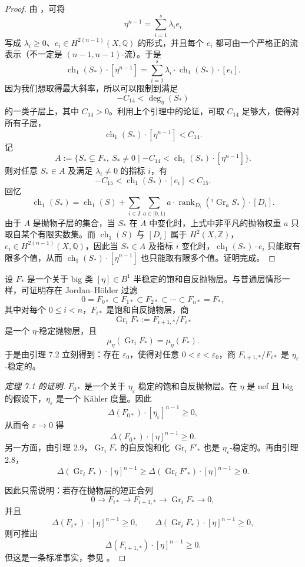 \documentclass[12pt,a4paper]{article}
\newcommand{\ch}{\operatorname{ch}}
\newcommand{\rank}{\operatorname{rank}}
\newcommand{\Gr}{\operatorname{Gr}}
\begin{document}
\begin{proof}
由 \cite[Lemma 2.2]{Cao}，可将
\[
\eta^{n-1}=\sum_{i=1}^s \lambda_i e_i
\]
写成 \(\lambda_i\ge 0\)、\(e_i\in H^{2(n-1)}(X,\mathbb Q)\) 的形式，并且每个 \(e_i\) 都可由一个严格正的流表示（不一定是 \((n-1,n-1)\)-流）。于是
\[
\ch_1(S_*)\cdot [\eta^{n-1}]
=
\sum_{i=1}^s \lambda_i \cdot \ch_1(S_*)\cdot [e_i].
\]
因为我们想取得最大斜率，所以可以限制到满足
\[
-C_{14}<\deg_\eta(S_*)
\]
的一类子层上，其中 \(C_{14}>0\)。利用上个引理中的论证，可取 \(C_{14}\) 足够大，使得对所有子层，
\[
\ch_1(S_*)\cdot [\eta^{n-1}]<C_{14}.
\]
记
\[
A:=\{S_*\subsetneq F_*,\ S_*\ne 0\mid -C_{14}<\ch_1(S_*)\cdot [\eta^{n-1}]\}.
\]
则对任意 \(S_*\in A\) 及满足 \(\lambda_i\ne 0\) 的指标 \(i\)，有
\[
-C_{15}<\ch_1(S_*)\cdot [e_i]<C_{15}.
\]
回忆
\[
\ch_1(S_*)
=
\ch_1(S)
+
\sum_{i\in I}\sum_{a\in[0,1)}
a\cdot \rank_{D_i}({}^i\Gr_aS_*)\cdot [D_i].
\]
由于 \(A\) 是抛物子层的集合，当 \(S_*\) 在 \(A\) 中变化时，上式中非平凡的抛物权重 \(a\) 只取自某个有限实数集。而 \(\ch_1(S)\) 与 \([D_i]\) 属于 \(H^2(X,\mathbb Z)\)，\(e_i\in H^{2(n-1)}(X,\mathbb Q)\)，因此当 \(S_*\in A\) 及指标 \(i\) 变化时，\(\ch_1(S_*)\cdot e_i\) 只能取有限多个值，从而 \(\ch_1(S_*)\cdot [\eta^{n-1}]\) 也只能取有限多个值。证明完成。
\end{proof}

设 \(F_*\) 是一个关于 big 类 \([\eta]\in B^1\) 半稳定的饱和自反抛物层。与普通层情形一样，可证明存在 Jordan--H\"older 过滤
\[
0=F_{0*}\subset F_{1*}\subset F_{2*}\subset \cdots \subset F_{n*}=F_*,
\]
其中对每个 \(0\le i<n\)，\(F_{i*}\) 是饱和自反抛物层，商
\[
\Gr_iF_*:=F_{i+1,*}/F_{i*}
\]
是一个 \(\eta\)-稳定抛物层，且
\[
\mu_\eta(\Gr_iF_*)=\mu_\eta(F_*).
\]
于是由引理 7.2 立刻得到：存在 \(\varepsilon_0\)，使得对任意 \(0<\varepsilon<\varepsilon_0\)，商 \(F_{i+1,*}/F_{i*}\) 是 \(\eta_\varepsilon\)-稳定的。

\begin{proof}[定理 7.1 的证明]
\(F_{0*}\) 是一个关于 \(\eta_\varepsilon\) 稳定的饱和自反抛物层。在 \(\eta\) 是 nef 且 big 的假设下，\(\eta_\varepsilon\) 是一个 Kähler 度量。因此
\[
\Delta(F_{0*})\cdot [\eta_\varepsilon]^{n-1}\ge 0,
\]
从而令 \(\varepsilon\to 0\) 得
\[
\Delta(F_{0*})\cdot [\eta]^{n-1}\ge 0.
\]
另一方面，由引理 2.9，\(\Gr_iF_*\) 的自反饱和化 \(\Gr_iF'_*\) 也是 \(\eta_\varepsilon\)-稳定的。再由引理 2.8，
\[
\Delta(\Gr_iF_*)\cdot [\eta]^{n-1}
\ge
\Delta(\Gr_iF'_*)\cdot [\eta]^{n-1}
\ge 0.
\]

因此只需说明：若存在抛物层的短正合列
\[
0\to F_{i*}\to F_{i+1,*}\to \Gr_iF_*\to 0,
\]
并且
\[
\Delta(F_{i*})\cdot [\eta]^{n-1}\ge 0,\qquad
\Delta(\Gr_iF_*)\cdot [\eta]^{n-1}\ge 0,
\]
则可推出
\[
\Delta(F_{i+1,*})\cdot [\eta]^{n-1}\ge 0.
\]
但这是一条标准事实，参见 \cite[Lemma 3.7]{ClaudonGrafGuenancia}。
\end{proof}
\end{document}
